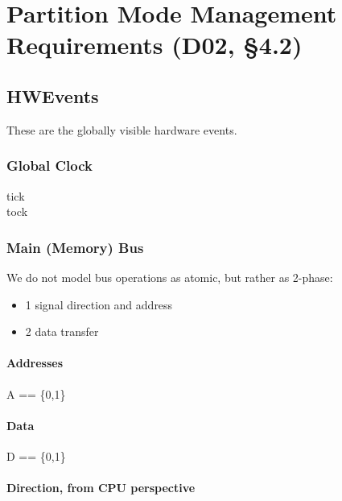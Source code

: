 \chapter{Partition Mode Management Requirements (D02, \S4.2)}


\section{HWEvents}

These are the globally visible hardware events.

\subsection{Global Clock}

\begin{circus}
\circchannel tick\\  %
\circchannel tock  %
\end{circus}

\subsection{Main (Memory) Bus}

  We do not model bus operations as atomic, but rather as 2-phase:
	\begin{itemize}
   \item{1} signal direction and address
   \item{2} data transfer
	 \end{itemize}

\subsubsection{Addresses}

\begin{circus}
A == \{0,1\}
\end{circus}

\subsubsection{Data}

\begin{circus}
D == \{0,1\}
\end{circus}

\subsubsection{Direction, from CPU perspective}

